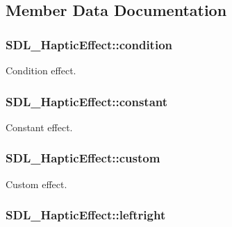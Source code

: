 \subsection{Member Data Documentation}
\hypertarget{union_s_d_l___haptic_effect_aa8fdd1ba202ccd7e61f48ef9977080d2}{
\subsubsection[{condition}]{ S\-D\-L\-\_\-\-Haptic\-Effect\-::condition}}\label{union_s_d_l___haptic_effect_aa8fdd1ba202ccd7e61f48ef9977080d2}
Condition effect. \hypertarget{union_s_d_l___haptic_effect_ac435275e9683d6cc5d65b9c7cc2ec659}{
\subsubsection[{constant}]{ S\-D\-L\-\_\-\-Haptic\-Effect\-::constant}}\label{union_s_d_l___haptic_effect_ac435275e9683d6cc5d65b9c7cc2ec659}
Constant effect. \hypertarget{union_s_d_l___haptic_effect_a0b2d2af28c515cc39896b2b7c23019d2}{
\subsubsection[{custom}]{ S\-D\-L\-\_\-\-Haptic\-Effect\-::custom}}\label{union_s_d_l___haptic_effect_a0b2d2af28c515cc39896b2b7c23019d2}
Custom effect. \hypertarget{union_s_d_l___haptic_effect_a3c254b81c1ff41c7888eee0cd0076a12}{
\subsubsection[{leftright}]{ S\-D\-L\-\_\-\-Haptic\-Effect\-::leftright}}\label{union_s_d_l___haptic_effect_a3c254b81c1ff41c7888eee0cd0076a12}

